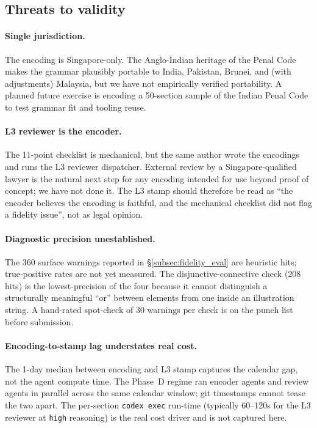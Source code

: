 \subsection{Threats to validity}
\label{subsec:threats}

\paragraph{Single jurisdiction.} The encoding is Singapore-only. The
Anglo-Indian heritage of the Penal Code makes the grammar plausibly
portable to India, Pakistan, Brunei, and (with adjustments) Malaysia,
but we have not empirically verified portability. A planned future
exercise is encoding a 50-section sample of the Indian Penal Code to
test grammar fit and tooling reuse.

\paragraph{L3 reviewer is the encoder.} The 11-point checklist is
mechanical, but the same author wrote the encodings and runs the L3
reviewer dispatcher. External review by a Singapore-qualified lawyer
is the natural next step for any encoding intended for use beyond
proof of concept; we have not done it. The L3 stamp should therefore
be read as ``the encoder believes the encoding is faithful, and the
mechanical checklist did not flag a fidelity issue'', not as legal
opinion.

\paragraph{Diagnostic precision unestablished.} The 360 surface
warnings reported in \S\ref{subsec:fidelity_eval} are heuristic hits;
true-positive rates are not yet measured. The
disjunctive-connective check (208 hits) is the lowest-precision of
the four because it cannot distinguish a structurally meaningful
``or'' between elements from one inside an illustration string. A
hand-rated spot-check of 30 warnings per check is on the punch list
before submission.

\paragraph{Encoding-to-stamp lag understates real cost.} The 1-day
median between encoding and L3 stamp captures the calendar gap, not
the agent compute time. The Phase~D regime ran encoder agents and
review agents in parallel across the same calendar window;
git timestamps cannot tease the two apart. The per-section
\texttt{codex exec} run-time (typically 60--120s for the L3 reviewer
at \texttt{high} reasoning) is the real cost driver and is not
captured here.
